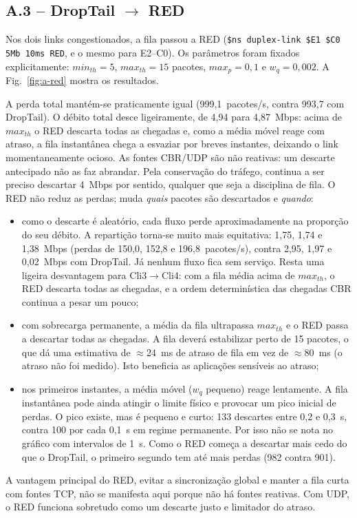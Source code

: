 \IfFileExists{llncs.cls}{\documentclass[runningheads]{llncs}}{\documentclass{article}}
\newcommand{\esp}[1]{#1}
\begin{document}
\subsection{A.3 -- DropTail $\rightarrow$ RED}
Nos dois links congestionados, a fila passou a RED
(\texttt{\$ns duplex-link \$E1 \$C0 5Mb 10ms RED}, e o mesmo para E2--C0). Os parâmetros foram
fixados explicitamente: $min_{th}=5$, $max_{th}=15$ pacotes, $max_p=0{,}1$ e $w_q=0{,}002$. A
Fig.~\ref{fig:a-red} mostra os resultados.

A perda total mantém-se praticamente igual (\esp{999,1~pacotes/s}, contra 993,7 com
DropTail). O débito total desce ligeiramente, de 4,94 para \esp{4,87~Mbps}: acima de
$max_{th}$ o RED descarta todas as chegadas e, como a média móvel reage com atraso, a fila
instantânea chega a esvaziar por breves instantes, deixando o link momentaneamente ocioso. As fontes CBR/UDP são não reativas: um descarte antecipado não
as faz abrandar. Pela conservação do tráfego, continua a ser preciso descartar 4~Mbps por
sentido, qualquer que seja a disciplina de fila. O RED não reduz as perdas; muda \emph{quais}
pacotes são descartados e \emph{quando}:
\begin{itemize}
\item como o descarte é aleatório, cada fluxo perde aproximadamente na proporção do seu
débito. A repartição torna-se \esp{muito mais equitativa: 1,75, 1,74 e 1,38~Mbps}
(perdas de \esp{150,0, 152,8 e 196,8~pacotes/s}), contra 2,95, 1,97 e 0,02~Mbps com DropTail.
Já nenhum fluxo fica sem serviço. Resta uma ligeira desvantagem para Cli3$\rightarrow$Cli4:
com a fila média acima de $max_{th}$, o RED descarta todas as chegadas, e a ordem
determinística das chegadas CBR continua a pesar um pouco;
\item com sobrecarga permanente, a média da fila ultrapassa $max_{th}$ e o RED passa a
descartar todas as chegadas. A fila deverá estabilizar perto de 15 pacotes, o que dá
uma estimativa de $\approx$24~ms de atraso de fila em vez de $\approx$80~ms (o atraso não foi
medido). Isto beneficia as aplicações
sensíveis ao atraso;
\item nos primeiros instantes, a média móvel ($w_q$ pequeno) reage lentamente. A fila
instantânea pode ainda atingir o limite físico e provocar \esp{um pico inicial de perdas}.
O pico existe, mas é pequeno e curto: \esp{133 descartes entre 0,2 e 0,3~s}, contra 100 por
cada 0,1~s em regime permanente. Por isso não se nota no gráfico com intervalos de 1~s.
Como o RED começa a descartar mais cedo do que o DropTail, o primeiro segundo tem até mais
perdas (982 contra 901).
\end{itemize}
A vantagem principal do RED, evitar a sincronização global e manter a fila curta com fontes
TCP, não se manifesta aqui porque não há fontes reativas. Com UDP, o RED funciona sobretudo
como um descarte justo e limitador do atraso.
\end{document}
